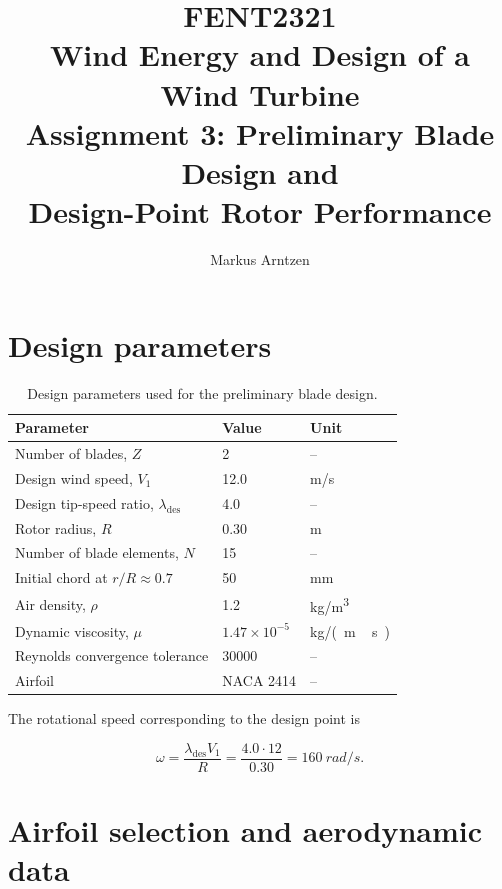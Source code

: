 \documentclass[11pt,a4paper]{article}
\title{
    \textbf{FENT2321}\\[0.3cm]
    Wind Energy and Design of a Wind Turbine\\[0.5cm]
    \Large Assignment 3: Preliminary Blade Design and\\
    Design-Point Rotor Performance
}
\author{Markus Arntzen}
\date{}
\begin{document}
\maketitle
\thispagestyle{empty}

\clearpage
\tableofcontents
\clearpage

\section{Design parameters}

\begin{table}[H]
\centering
\label{tab:design}
\begin{tabular}{lll}
    \toprule
    Parameter & Value & Unit \\
    \midrule
    Number of blades, $Z$ & 2 & -- \\
    Design wind speed, $V_1$ & 12.0 & \si{m/s} \\
    Design tip-speed ratio, $\lambda_{\mathrm{des}}$ & 4.0 & -- \\
    Rotor radius, $R$ & 0.30 & \si{m} \\
    Number of blade elements, $N$ & 15 & -- \\
    Initial chord at $r/R\approx0.7$ & 50 & \si{mm} \\
    Air density, $\rho$ & 1.2 & \si{kg/m^3} \\
    Dynamic viscosity, $\mu$ & $1.47\times10^{-5}$ & \si{kg/(m\,s)} \\
    Reynolds convergence tolerance & 30000 & -- \\
    Airfoil & NACA 2414 & -- \\
    \bottomrule
\end{tabular}
\caption{Design parameters used for the preliminary blade design.}
\end{table}

The rotational speed corresponding to the design point is

\begin{equation}
    \omega
    =
    \frac{\lambda_{\mathrm{des}}V_1}{R}
    =
    \frac{4.0\cdot12}{0.30}
    =
    \SI{160}{rad/s}.
\end{equation}

\section{Airfoil selection and aerodynamic data}
\end{document}
